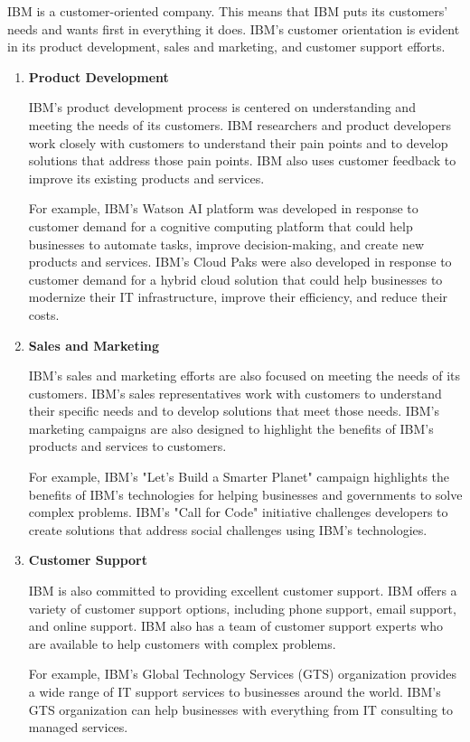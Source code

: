 IBM is a customer-oriented company. This means that IBM puts its customers' needs and wants first in everything it does. IBM's customer orientation is evident in its product development, sales and marketing, and customer support efforts.
\begin{enumerate}
\item \textbf{Product Development}

IBM's product development process is centered on understanding and meeting the needs of its customers. IBM researchers and product developers work closely with customers to understand their pain points and to develop solutions that address those pain points. IBM also uses customer feedback to improve its existing products and services.

For example, IBM's Watson AI platform was developed in response to customer demand for a cognitive computing platform that could help businesses to automate tasks, improve decision-making, and create new products and services. IBM's Cloud Paks were also developed in response to customer demand for a hybrid cloud solution that could help businesses to modernize their IT infrastructure, improve their efficiency, and reduce their costs.

\item \textbf{Sales and Marketing}

IBM's sales and marketing efforts are also focused on meeting the needs of its customers. IBM's sales representatives work with customers to understand their specific needs and to develop solutions that meet those needs. IBM's marketing campaigns are also designed to highlight the benefits of IBM's products and services to customers.

For example, IBM's "Let's Build a Smarter Planet" campaign highlights the benefits of IBM's technologies for helping businesses and governments to solve complex problems. IBM's "Call for Code" initiative challenges developers to create solutions that address social challenges using IBM's technologies.

\item \textbf{Customer Support}

IBM is also committed to providing excellent customer support. IBM offers a variety of customer support options, including phone support, email support, and online support. IBM also has a team of customer support experts who are available to help customers with complex problems.

For example, IBM's Global Technology Services (GTS) organization provides a wide range of IT support services to businesses around the world. IBM's GTS organization can help businesses with everything from IT consulting to managed services.
\end{enumerate}

